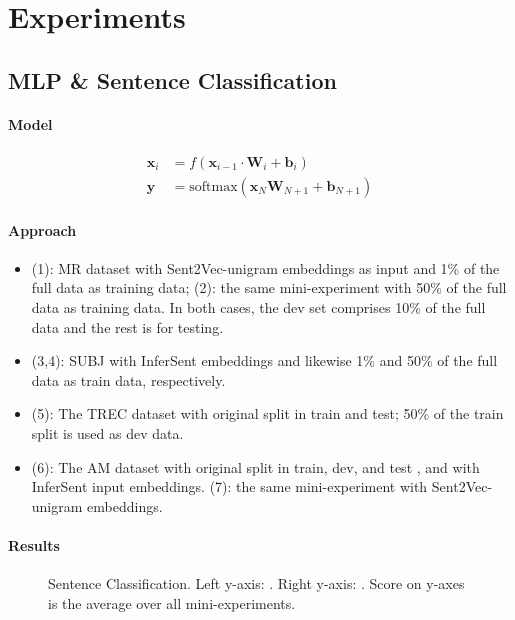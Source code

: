 \section{Experiments}\label{sec:experiments}

\subsection{MLP \& Sentence Classification}\label{sec:1}

\paragraph{Model}

\begin{align*}
  \mathbf{x}_i &= f(\mathbf{x}_{i-1}\cdot \mathbf{W}_i+\mathbf{b}_i)\\
  \mathbf{y} &= \text{softmax}(\mathbf{x}_{N}\mathbf{W}_{N+1}+\mathbf{b}_{N+1})
\end{align*}

\paragraph{Approach}

\begin{itemize}[noitemsep,leftmargin=0.6cm]
  \item (1): MR dataset with Sent2Vec-unigram embeddings as input and 1\% of the full data as training data; (2): the same mini-experiment with 50\% of the full data as training data. In both cases, the dev set comprises 10\% of the full data and the rest is for testing. 
  \item (3,4): SUBJ with InferSent embeddings and likewise 1\% and 50\% of the full data as train data, respectively.
  \item (5): The TREC dataset with original split in train and test; 50\% of the train split is used as dev data. 
  \item (6): The AM dataset with original split in train, dev, and test \cite{Eger:2017}, and with InferSent input embeddings. (7): the same mini-experiment with Sent2Vec-unigram embeddings. 
\end{itemize}

\paragraph{Results}

\begin{figure}[htb]
  \centering
  \scalebox{0.5}{}
  \caption{Sentence Classification. Left y-axis: \best. Right y-axis: \avg{}. Score on y-axes is the average over all mini-experiments.}
  \label{fig:sent}
\end{figure}

